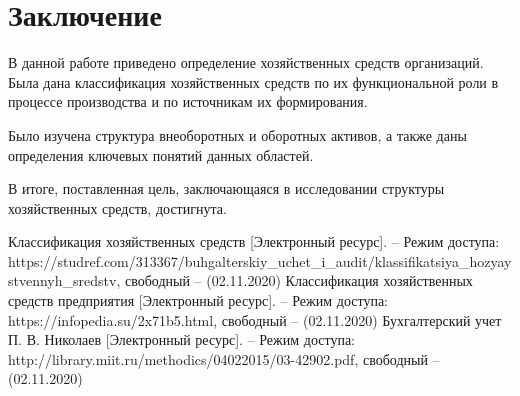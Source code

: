 \documentclass[a4paper,14pt]{extarticle}
\begin{document}
 	\newpage
 	\section{Заключение}
 	
 	В данной работе приведено определение хозяйственных средств организаций. Была дана классификация хозяйственных средств по их функциональной роли в процессе производства и по источникам их формирования.
 	
 	Было изучена структура внеоборотных и оборотных активов, а также даны определения ключевых понятий данных областей.
 	
 	В итоге, поставленная цель, заключающаяся в исследовании
 	структуры хозяйственных средств, достигнута.
 	
 	\newpage
 	
 	
 	\begin{thebibliography}{3}
 		Классификация хозяйственных средств [Электронный ресурс]. – Режим доступа: 
 		https://studref.com/313367/buhgalterskiy\_uchet\_i\_audit/klassifikatsiya\_hozyaystvennyh\_sredstv, 
 		свободный – (02.11.2020)
 		 Классификация хозяйственных средств предприятия [Электронный ресурс]. – Режим доступа: 
 		https://infopedia.su/2x71b5.html, 
 		свободный – (02.11.2020)
 		 Бухгалтерский учет П. В. Николаев [Электронный ресурс]. – Режим доступа: 
 		http://library.miit.ru/methodics/04022015/03-42902.pdf, 
 		свободный – (02.11.2020)
 	\end{thebibliography}
 	
 
\end{document}
